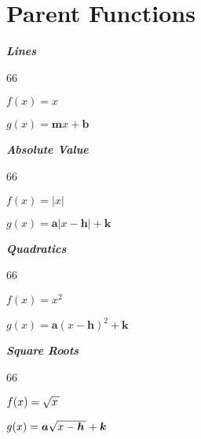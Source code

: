 \section{Parent Functions}

{
    \begin{minipage}{0.2\textwidth}
        \begin{center}
            {\bfseries\itshape Lines}\\
            \begin{myTikzpictureGrid}{0.25} {6}{6}
                \tkzFct[ solid, very thick, samples=100, domain=-10:10,]{\x}
            \end{myTikzpictureGrid}
        \end{center}\vspace{-1\onelineskip}
        {$f(x) = x$}

        {$g(x) = \bm{m}x + \bm{b}$}
    \end{minipage}
}
\hfill 
{
    \begin{minipage}{0.2\textwidth}
        \begin{center}
            {\bfseries\itshape Absolute Value}\\
            \begin{myTikzpictureGrid}{0.25} {6}{6}
            \end{myTikzpictureGrid}
        \end{center}\vspace{-1\onelineskip}
        {$f(x) = |x|$}

        {$g(x) = \bm{a}|x-\bm{h}| + \bm{k}$}
    \end{minipage}
}
\hfill 
{
    \begin{minipage}{0.2\textwidth}
        \begin{center}
            {\bfseries\itshape Quadratics}\\
            \begin{myTikzpictureGrid}{0.25} {6}{6}
            \end{myTikzpictureGrid}
        \end{center}\vspace{-1\onelineskip}
        {$f(x) = x^2$}

        {$g(x) = \bm{a}(x-\bm{h})^2 + \bm{k}$}
    \end{minipage}
}
\hfill 
{
    \begin{minipage}{0.2\textwidth}
        \begin{center}
            {\bfseries\itshape Square Roots}\\
            \begin{myTikzpictureGrid}{0.25} {6}{6}
            \end{myTikzpictureGrid}
        \end{center}\vspace{-1\onelineskip}
        {$f(x) = \myRoot{x}$}

        {$g(x) = \bm{a}\myRoot{x-\bm{h}} + \bm{k}$}
    \end{minipage}
}

